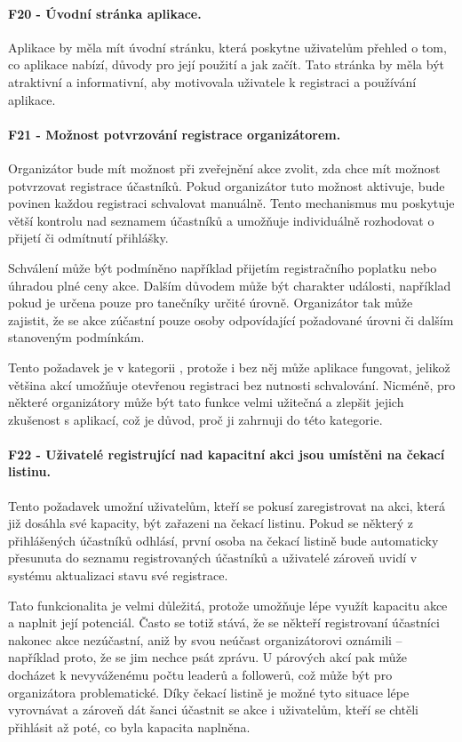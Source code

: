 \paragraph{F20 - Úvodní stránka aplikace.}\label{req:F20}
Aplikace by měla mít úvodní stránku, která poskytne uživatelům přehled o tom, co aplikace nabízí, důvody pro její použití a jak začít. Tato stránka by měla být atraktivní a informativní, aby motivovala uživatele k registraci a používání aplikace.

\paragraph{F21 - Možnost potvrzování registrace organizátorem.}\label{req:F21}
Organizátor bude mít možnost při zveřejnění akce zvolit, zda chce mít možnost potvrzovat registrace účastníků. Pokud organizátor tuto možnost aktivuje, bude povinen každou registraci schvalovat manuálně. Tento mechanismus mu poskytuje větší kontrolu nad seznamem účastníků a umožňuje individuálně rozhodovat o přijetí či odmítnutí přihlášky.

Schválení může být podmíněno například přijetím registračního poplatku nebo úhradou plné ceny akce. Dalším důvodem může být charakter události, například pokud je určena pouze pro tanečníky určité úrovně. Organizátor tak může zajistit, že se akce zúčastní pouze osoby odpovídající požadované úrovni či dalším stanoveným podmínkám.

Tento požadavek je v kategorii , protože i bez něj může aplikace fungovat, jelikož většina akcí umožňuje otevřenou registraci bez nutnosti schvalování. Nicméně, pro některé organizátory může být tato funkce velmi užitečná a zlepšit jejich zkušenost s aplikací, což je důvod, proč ji zahrnuji do této kategorie.

\paragraph{F22 - Uživatelé registrující nad kapacitní akci jsou umístěni na čekací listinu.}\label{req:F22}
Tento požadavek umožní uživatelům, kteří se pokusí zaregistrovat na akci, která již dosáhla své kapacity, být zařazeni na čekací listinu. Pokud se některý z přihlášených účastníků odhlásí, první osoba na čekací listině bude automaticky přesunuta do seznamu registrovaných účastníků a uživatelé zároveň uvidí v systému aktualizaci stavu své registrace.

Tato funkcionalita je velmi důležitá, protože umožňuje lépe využít kapacitu akce a naplnit její potenciál. Často se totiž stává, že se někteří registrovaní účastníci nakonec akce nezúčastní, aniž by svou neúčast organizátorovi oznámili – například proto, že se jim nechce psát zprávu. U párových akcí pak může docházet k nevyváženému počtu leaderů a followerů, což může být pro organizátora problematické. Díky čekací listině je možné tyto situace lépe vyrovnávat a zároveň dát šanci účastnit se akce i uživatelům, kteří se chtěli přihlásit až poté, co byla kapacita naplněna.

